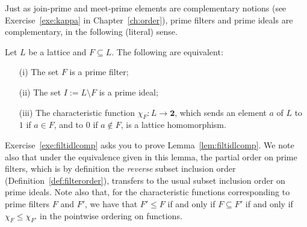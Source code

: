 Just as join-prime and meet-prime elements are complementary notions (see Exercise~\ref{exe:kappa} in Chapter~\ref{ch:order}), prime filters and prime ideals are complementary, in the following (literal) sense.
\begin{lemma}\label{lem:filtidlcomp}  
Let $L$ be a lattice and $F \subseteq L$. The following are equivalent:
\begin{enumerate}
\item[(i)] The set $F$ is a prime filter;
\item[(ii)] The set $I := L \setminus F$ is a prime ideal;
\item[(iii)] The characteristic function $\chi_F \colon L \to \mathbf{2}$, which sends an element $a$ of $L$ to $1$ if $a \in F$, and to $0$ if $a \not\in F$, is a lattice homomorphism.
\end{enumerate}
\end{lemma}
Exercise~\ref{exe:filtidlcomp} asks you to prove Lemma~\ref{lem:filtidlcomp}.
We note also that under the equivalence given in this lemma, the partial order on prime filters, which is by definition the \emph{reverse} subset inclusion order (Definition~\ref{def:filterorder}), transfers to the usual subset inclusion order on prime ideals. Note also that, for the characteristic functions corresponding to prime filters $F$ and $F'$, we have that $F' \leq F$ if and only if $F \subseteq F'$ if and only if $\chi_{F} \leq \chi_{F'}$ in the pointwise ordering on functions.

